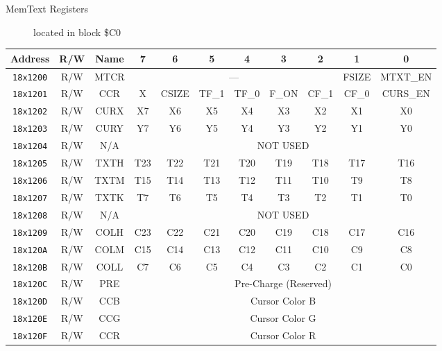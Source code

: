 \begin{description}
  \item[MemText Registers] located in block \$C0
\end{description}
\begin{table}[ht]
    \begin{center}
        \begin{tabular}{|c|c|c|c|c|c|c|c|c|c|c|} \hline
            Address & R/W & Name & 7 & 6 & 5 & 4 & 3 & 2 & 1 & 0 \\\hline\hline
            \verb+18x1200+ & R/W & MTCR & \multicolumn{6}{|c|}{---} & FSIZE & MTXT\_EN \\ \hline
            \verb+18x1201+ & R/W & CCR & X & CSIZE & TF\_1 & TF\_0 & F\_ON & CF\_1 & CF\_0 & CURS\_EN  \\ \hline
            \verb+18x1202+ & R/W & CURX & X7 & X6 & X5 & X4 & X3 & X2 & X1 & X0 \\ \hline
            \verb+18x1203+ & R/W & CURY & Y7 & Y6 & Y5 & Y4 & Y3 & Y2 & Y1 & Y0 \\ \hline
            \verb+18x1204+ & R/W & N/A & \multicolumn{8}{|c|}{NOT USED} \\ \hline            
            \verb+18x1205+ & R/W & TXTH & T23 & T22 & T21 & T20 & T19 & T18 & T17 & T16 \\ \hline
            \verb+18x1206+ & R/W & TXTM & T15 & T14 & T13 & T12 & T11 & T10 & T9 & T8 \\ \hline
            \verb+18x1207+ & R/W & TXTK & T7 & T6 & T5 & T4 & T3 & T2 & T1 & T0 \\ \hline
            \verb+18x1208+ & R/W & N/A & \multicolumn{8}{|c|}{NOT USED} \\ \hline
            \verb+18x1209+ & R/W & COLH & C23 & C22 & C21 & C20 & C19 & C18 & C17 & C16 \\ \hline
            \verb+18x120A+ & R/W & COLM & C15 & C14 & C13 & C12 & C11 & C10 & C9 & C8 \\ \hline
            \verb+18x120B+ & R/W & COLL & C7 & C6 & C5 & C4 & C3 & C2 & C1 & C0 \\ \hline
            \verb+18x120C+ & R/W & PRE & \multicolumn{8}{|c|}{Pre-Charge (Reserved)} \\ \hline
            \verb+18x120D+ & R/W & CCB & \multicolumn{8}{|c|}{Cursor Color B} \\ \hline
            \verb+18x120E+ & R/W & CCG & \multicolumn{8}{|c|}{Cursor Color G} \\ \hline
            \verb+18x120F+ & R/W & CCR & \multicolumn{8}{|c|}{Cursor Color R} \\ \hline

\end{tabular}
\end{center}
\end{table}
